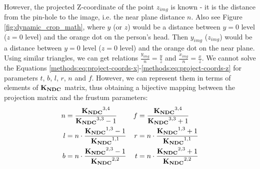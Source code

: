 However, the projected Z-coordinate of the point $z_{img}$ is known - it is the distance from the pin-hole to the image, i.e. the near plane distance $n$. Also see Figure \ref{fig:dynamic_crop_math}, where $y$ (or $z$) would be a distance between $y=0$ level ($z=0$ level) and the orange dot on the person's head. Then $y_{img}$ ($z_{img}$) would be a distance between $y=0$ level ($z = 0$ level) and the orange dot on the near plane. Using similar triangles, we can get relations $\tfrac{y_{img}}{n} = \tfrac{y}{z}$ and $\tfrac{x_{img}}{n} = \tfrac{x}{z}$. We cannot solve the Equations \ref{methods:eq:project-coords-x}-\ref{methods:eq:project-coords-z} for parameters $t$, $b$, $l$, $r$, $n$ and $f$. However, we can represent them in terms of elements of $\bm{\mathrm{K_{NDC}}}$ matrix, thus obtaining a bijective mapping between the projection matrix and the frustum parameters:
\begin{align}
	n &= \dfrac{\bm{\mathrm{K_{NDC}}}^{3,4}}{\bm{\mathrm{K_{NDC}}}^{3,3} - 1} & f &= \dfrac{\bm{\mathrm{K_{NDC}}}^{3, 4}}{\bm{\mathrm{K_{NDC}}}^{3, 3} + 1} \\
	l &= n\cdot \dfrac{\bm{\mathrm{K_{NDC}}}^{1,3} - 1}{\bm{\mathrm{K_{NDC}}}^{1,1}} & r &= n\cdot \dfrac{\bm{\mathrm{K_{NDC}}}^{1,3} + 1}{\bm{\mathrm{K_{NDC}}}^{1,1}} \\
	b &= n\cdot \dfrac{\bm{\mathrm{K_{NDC}}}^{2,3} - 1}{\bm{\mathrm{K_{NDC}}}^{2,2}} & t &= n\cdot \dfrac{\bm{\mathrm{K_{NDC}}}^{2,3} + 1}{\bm{\mathrm{K_{NDC}}}^{2,2}} \label{methods:eq:frustum-from-matrix}
\end{align}

